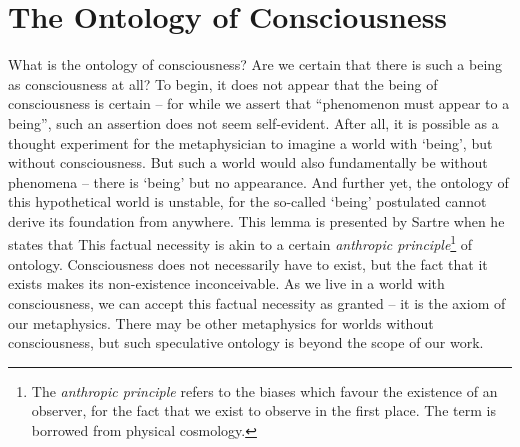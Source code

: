 \section{The Ontology of Consciousness}


What is the ontology of consciousness? 
Are we certain that there is such a being as consciousness at all? To begin, it does not appear that the being of consciousness is certain -- for while we assert that \enquote{phenomenon must appear to a being}, such an assertion does not seem self-evident. After all, it is possible as a thought experiment for the metaphysician to imagine a world with \enquote*{being}, but without consciousness. But such a world would also fundamentally be without phenomena -- there is \enquote*{being} but no appearance. And further yet, the ontology of this hypothetical world is unstable, for the so-called \enquote*{being} postulated cannot derive its foundation from anywhere. This lemma is presented by Sartre when he states that  This factual necessity is akin to a certain \emph{anthropic principle}\footnote{The \emph{anthropic principle} refers to the biases which favour the existence of an observer, for the fact that we exist to observe in the first place. The term is borrowed from physical cosmology.} of ontology. Consciousness does not necessarily have to exist, but the fact that it exists makes its non-existence inconceivable. As we live in a world with consciousness, we can accept this factual necessity as granted -- it is the axiom of our metaphysics. There may be other metaphysics for worlds without consciousness, but such speculative ontology is beyond the scope of our work.

